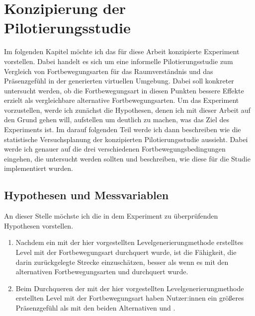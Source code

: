 \chapter{Konzipierung der Pilotierungsstudie}\label{chapter:experiment}
    Im folgenden Kapitel möchte ich das für diese Arbeit konzipierte Experiment vorstellen. Dabei handelt es sich um eine informelle Pilotierungsstudie zum Vergleich von Fortbewegungsarten für das Raumverständnis und das Präsenzgefühl in der generierten virtuellen Umgebung. Dabei soll konkreter untersucht werden, ob die Fortbewegungsart  in diesen Punkten bessere Effekte erzielt als vergleichbare alternative Fortbewegungsarten.
    Um das Experiment vorzustellen, werde ich zunächst die Hypothesen, denen ich mit dieser Arbeit auf den Grund gehen will, aufstellen um deutlich zu machen, was das Ziel des Experiments ist.
    Im darauf folgenden Teil werde ich dann beschreiben wie die statistische Versuchsplanung der konzipierten Pilotierungsstudie aussieht. Dabei werde ich genauer auf die drei verschiedenen Fortbewegungsbedingungen eingehen, die untersucht werden sollten und beschreiben, wie diese für die Studie implementiert wurden.

    \section{Hypothesen und Messvariablen}
        An dieser Stelle möchste ich die in dem Experiment zu überprüfenden Hypothesen vorstellen.

        \begin{enumerate}
            \item Nachdem ein mit der hier vorgestellten Levelgenerierungmethode erstelltes Level mit der Fortbewegungsart  durchquert wurde, ist die Fähigkeit, die darin zurückgelegte Strecke einzuschätzen, besser als wenn es mit den alternativen Fortbewegungsarten  und  durchquert wurde.

            \item Beim Durchqueren der mit der hier vorgestellten Levelgenerierungmethode erstellten Level mit der  Fortbewegungsart haben Nutzer:innen ein größeres Präsenzgefühl als mit den beiden Alternativen  und .
        \end{enumerate}

